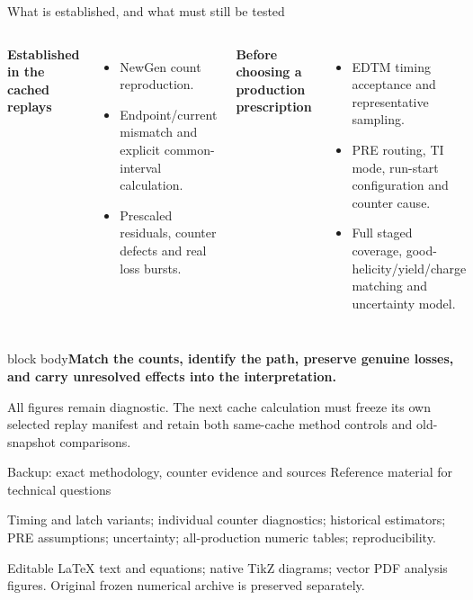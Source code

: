 \documentclass[aspectratio=169,11pt]{beamer}
\newcommand{\source}[1]{\par\vfill{\scriptsize\color{muted}#1\par}}
\newcommand{\takeaway}[1]{\begin{beamercolorbox}[sep=2.5mm,wd=\linewidth]{block body}\textbf{#1}\end{beamercolorbox}}
\begin{document}
\begin{frame}{What is established, and what must still be tested}
\small
\begin{columns}[T]
\textbf{Established in the cached replays}
\small\begin{itemize}\setlength\itemsep{2mm}
\item NewGen count reproduction.
\item Endpoint/current mismatch and explicit common-interval calculation.
\item Prescaled residuals, counter defects and real loss bursts.
\end{itemize}
\textbf{Before choosing a production prescription}
\small\begin{itemize}\setlength\itemsep{2mm}
\item EDTM timing acceptance and representative sampling.
\item PRE routing, TI mode, run-start configuration and counter cause.
\item Full staged coverage, good-helicity/yield/charge matching and uncertainty model.
\end{itemize}
\end{columns}
\vspace{1mm}\takeaway{Match the counts, identify the path, preserve genuine losses, and carry unresolved effects into the interpretation.}
\source{All figures remain diagnostic. The next cache calculation must freeze its own selected replay manifest and retain both same-cache method controls and old-snapshot comparisons.}
\end{frame}

\appendix
\begin{frame}{Backup: exact methodology, counter evidence and sources}
\large Reference material for technical questions\par\vspace{5mm}
\normalsize Timing and latch variants; individual counter diagnostics; historical estimators; PRE assumptions; uncertainty; all-production numeric tables; reproducibility.
\source{Editable LaTeX text and equations; native TikZ diagrams; vector PDF analysis figures. Original frozen numerical archive is preserved separately.}
\end{frame}
\end{document}
